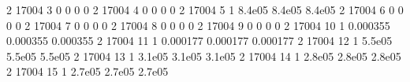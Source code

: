 \documentclass[letterpaper,10pt,english,openany,oneside]{sphinxmanual}
\begin{document}
\begin{sphinxVerbatim}[commandchars=\\\{\}]
     2 \textbar{}       17004 \textbar{}     3 \textbar{}           0 \textbar{}          0 \textbar{}        0 \textbar{}        0 \textbar{}        \textbar{}        \textbar{}        \textbar{}
     2 \textbar{}       17004 \textbar{}     4 \textbar{}           0 \textbar{}          0 \textbar{}        0 \textbar{}        0 \textbar{}        \textbar{}        \textbar{}        \textbar{}
     2 \textbar{}       17004 \textbar{}     5 \textbar{}           1 \textbar{}    8.4e\PYGZhy{}05 \textbar{}  8.4e\PYGZhy{}05 \textbar{}  8.4e\PYGZhy{}05 \textbar{}        \textbar{}        \textbar{}        \textbar{}
     2 \textbar{}       17004 \textbar{}     6 \textbar{}           0 \textbar{}          0 \textbar{}        0 \textbar{}        0 \textbar{}        \textbar{}        \textbar{}        \textbar{}
     2 \textbar{}       17004 \textbar{}     7 \textbar{}           0 \textbar{}          0 \textbar{}        0 \textbar{}        0 \textbar{}        \textbar{}        \textbar{}        \textbar{}
     2 \textbar{}       17004 \textbar{}     8 \textbar{}           0 \textbar{}          0 \textbar{}        0 \textbar{}        0 \textbar{}        \textbar{}        \textbar{}        \textbar{}
     2 \textbar{}       17004 \textbar{}     9 \textbar{}           0 \textbar{}          0 \textbar{}        0 \textbar{}        0 \textbar{}        \textbar{}        \textbar{}        \textbar{}
     2 \textbar{}       17004 \textbar{}    10 \textbar{}           1 \textbar{}   0.000355 \textbar{} 0.000355 \textbar{} 0.000355 \textbar{}        \textbar{}        \textbar{}        \textbar{}
     2 \textbar{}       17004 \textbar{}    11 \textbar{}           1 \textbar{}   0.000177 \textbar{} 0.000177 \textbar{} 0.000177 \textbar{}        \textbar{}        \textbar{}        \textbar{}
     2 \textbar{}       17004 \textbar{}    12 \textbar{}           1 \textbar{}    5.5e\PYGZhy{}05 \textbar{}  5.5e\PYGZhy{}05 \textbar{}  5.5e\PYGZhy{}05 \textbar{}        \textbar{}        \textbar{}        \textbar{}
     2 \textbar{}       17004 \textbar{}    13 \textbar{}           1 \textbar{}    3.1e\PYGZhy{}05 \textbar{}  3.1e\PYGZhy{}05 \textbar{}  3.1e\PYGZhy{}05 \textbar{}        \textbar{}        \textbar{}        \textbar{}
     2 \textbar{}       17004 \textbar{}    14 \textbar{}           1 \textbar{}    2.8e\PYGZhy{}05 \textbar{}  2.8e\PYGZhy{}05 \textbar{}  2.8e\PYGZhy{}05 \textbar{}        \textbar{}        \textbar{}        \textbar{}
     2 \textbar{}       17004 \textbar{}    15 \textbar{}           1 \textbar{}    2.7e\PYGZhy{}05 \textbar{}  2.7e\PYGZhy{}05 \textbar{}  2.7e\PYGZhy{}05 \textbar{}        \textbar{}        \textbar{}        \textbar{}

\end{sphinxVerbatim}
\end{document}

